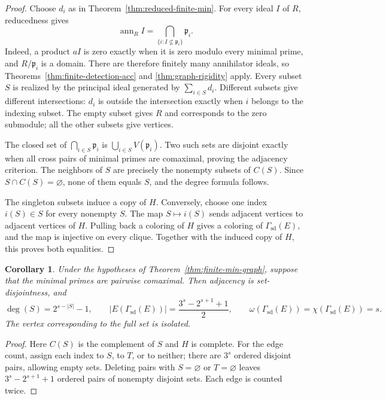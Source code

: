 \documentclass[11pt]{amsart}
\theoremstyle{plain}
\newtheorem{corollary}[theorem]{Corollary}
\theoremstyle{definition}
\theoremstyle{remark}
\newcommand{\ann}{\operatorname{ann}}
\newcommand{\GammaSD}{\Gamma_{\mathrm{sd}}}
\numberwithin{equation}{section}
\begin{document}
\begin{proof}
Choose $d_i$ as in Theorem~\ref{thm:reduced-finite-min}.
For every ideal $I$ of $R$, reducedness gives
\[
 \ann_R I=\bigcap_{\{i:I\not\subseteq\mathfrak p_i\}}\mathfrak p_i.
\]
Indeed, a product $aI$ is zero exactly when it is zero modulo every
minimal prime, and $R/\mathfrak p_i$ is a domain.
There are therefore finitely many annihilator ideals, so
Theorems~\ref{thm:finite-detection-acc} and \ref{thm:graph-rigidity}
apply. Every subset $S$ is realized by the principal ideal generated
by $\sum_{i\in S}d_i$.
Different subsets give different intersections: $d_i$ is outside the
intersection exactly when $i$ belongs to the indexing subset.
The empty subset gives $R$ and corresponds to the zero submodule;
all the other subsets give vertices.

The closed set of $\bigcap_{i\in S}\mathfrak p_i$ is
$\bigcup_{i\in S}V(\mathfrak p_i)$.
Two such sets are disjoint exactly when all cross pairs of minimal
primes are comaximal, proving the adjacency criterion.
The neighbors of $S$ are precisely the nonempty subsets of $C(S)$.
Since $S\cap C(S)=\varnothing$, none of them equals $S$, and the
degree formula follows.

The singleton subsets induce a copy of $H$.
Conversely, choose one index $i(S)\in S$ for every nonempty $S$.
The map $S\mapsto i(S)$ sends adjacent vertices to adjacent vertices
of $H$. Pulling back a coloring of $H$ gives a coloring of
$\GammaSD(E)$, and the map is injective on every clique.
Together with the induced copy of $H$, this proves both equalities.
\end{proof}

\begin{corollary}\label{cor:comaximal-min-graph}
Under the hypotheses of Theorem~\ref{thm:finite-min-graph}, suppose
that the minimal primes are pairwise comaximal. Then adjacency is
set-disjointness, and
\[
 \deg(S)=2^{s-|S|}-1,\qquad
 |E(\GammaSD(E))|=\frac{3^s-2^{s+1}+1}{2},\qquad
 \omega(\GammaSD(E))=\chi(\GammaSD(E))=s.
\]
The vertex corresponding to the full set is isolated.
\end{corollary}

\begin{proof}
Here $C(S)$ is the complement of $S$ and $H$ is complete.
For the edge count, assign each index to $S$, to $T$, or to neither;
there are $3^s$ ordered disjoint pairs, allowing empty sets.
Deleting pairs with $S=\varnothing$ or $T=\varnothing$ leaves
$3^s-2^{s+1}+1$ ordered pairs of nonempty disjoint sets.
Each edge is counted twice.
\end{proof}
\end{document}
